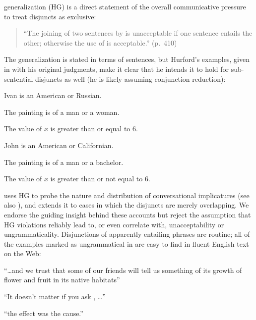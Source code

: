 \documentclass{article}
\begin{document}
 generalization (HG) is a direct statement of
the overall communicative pressure to treat disjuncts as exclusive:
%
\begin{quote}
  ``The joining of two sentences by  is unacceptable if one
  sentence entails the other; otherwise the use of  is
  acceptable.'' (p.~410)
\end{quote}
%
The generalization is stated in terms of sentences, but Hurford's
examples, given in  with his original judgments, make it clear
that he intends it to hold for sub-sentential disjuncts as well (he is
likely assuming conjunction reduction):
%
\begin{examples}
\item\label{hex}
  \begin{examples}
  \item Ivan is an American or Russian.
  \item The painting is of a man or a woman.
  \item The value of $x$ is greater than or equal to 6.
  \item\label{ex-bad1}\bad John is an American or Californian.
  \item\label{ex-bad2}\bad The painting is of a man or a bachelor.
  \item\label{ex-bad3}\bad The value of $x$ is greater than or not equal to 6.
  \end{examples}
\end{examples}

\citeauthor{Hurford:1974} uses HG to probe the nature and distribution
of conversational implicatures (see also
\citealt{Gazdar79b,ChierchiaFoxSpector08}), and \citet{Singh:2008}
extends it to cases in which the disjuncts are merely overlapping. We
endorse the guiding insight behind these accounts but reject the
assumption that HG violations reliably lead to, or even correlate
with, unacceptability or ungrammaticality. Disjunctions of apparently
entailing phrases are routine; all of the examples marked as
ungrammatical in  are easy to find in fluent English text on
the Web:
%
\begin{examples}
\item\label{hex-good}
  \begin{examples}
  \item ``\ldots and we trust that some of our  friends will tell us something of its growth of
    flower and fruit in its native habitats''
  \item ``It doesn't matter if you ask , \ldots''
  \item ``the effect was 
    the cause.''
  \end{examples}
\end{examples}
\end{document}
